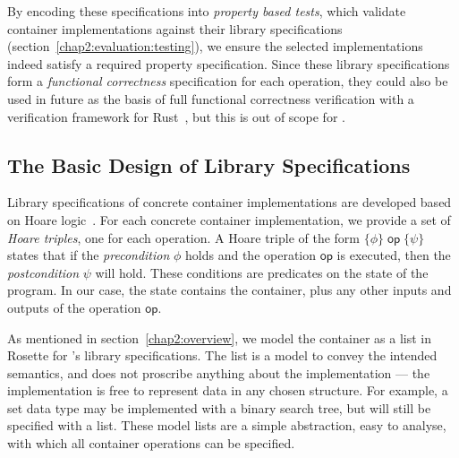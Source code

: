By encoding these specifications into \emph{property based tests}, which validate container implementations against their library specifications (section~\ref{chap2:evaluation:testing}), we ensure the selected implementations indeed satisfy a required property specification. Since these library specifications form a \emph{functional correctness} specification for each operation, they could also be used in future as the basis of full functional correctness verification with a verification framework for Rust~\citep{rustbelt-paper}, but this is out of scope for \Primrose{}.

\subsection{The Basic Design of Library Specifications}
\label{chap2:lib:design}
Library specifications of concrete container implementations are developed based on Hoare logic~\citep{10.1145/363235.363259}.
For each concrete container implementation, we provide a set of \emph{Hoare triples}, one for each operation. A Hoare triple of the form
$\{\phi\}\; \mathsf{op} \;\{\psi\}$ states that if the \textit{precondition} $\phi$ holds and the operation $\mathsf{op}$ is executed, then the \textit{postcondition} $\psi$ will hold.
These conditions are predicates on the state of the program. In our case, the state contains the container, plus any other inputs and outputs of the operation $\mathsf{op}$.

As mentioned in section~\ref{chap2:overview}, we model the container as a list in Rosette for \Primrose{}'s library specifications. The list is a model to convey the intended semantics, and does not proscribe anything about the implementation --- the implementation is free to represent 
data in any chosen structure. For example, a set data type may be implemented with a binary search tree, but will still be specified with a list. 
These model lists are a simple abstraction, easy to analyse, with which all container operations can be specified.

